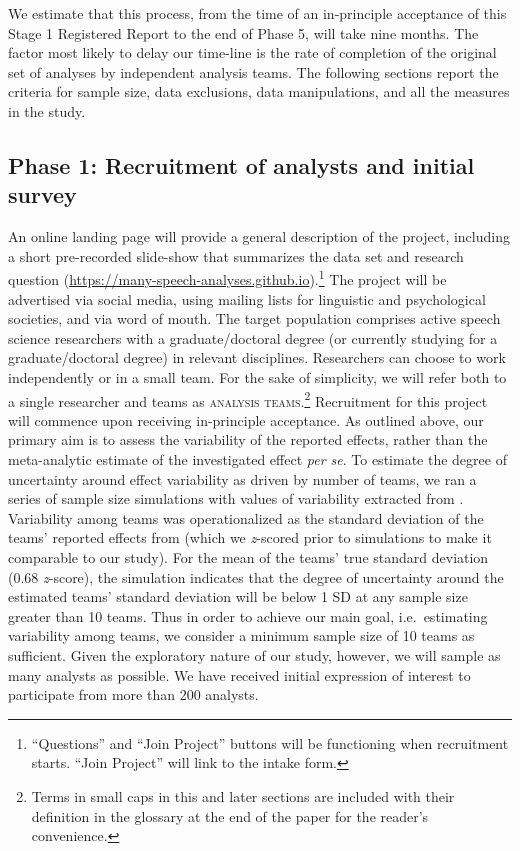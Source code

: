 \documentclass[Review,times,sageh]{sagej}
\begin{document}
We estimate that this process, from the time of an in-principle
acceptance of this Stage 1 Registered Report to the end of Phase 5, will
take nine months. The factor most likely to delay our time-line is the
rate of completion of the original set of analyses by independent
analysis teams. The following sections report the criteria for sample
size, data exclusions, data manipulations, and all the measures in the
study.

\subsection{Phase 1: Recruitment of analysts and initial
survey}\label{phase-1-recruitment-of-analysts-and-initial-survey}

An online landing page will provide a general description of the
project, including a short pre-recorded slide-show that summarizes the
data set and research question
(\url{https://many-speech-analyses.github.io}).\footnote{``Questions''
  and ``Join Project'' buttons will be functioning when recruitment
  starts. ``Join Project'' will link to the intake form.} The project
will be advertised via social media, using mailing lists for linguistic
and psychological societies, and via word of mouth. The target
population comprises active speech science researchers with a
graduate/doctoral degree (or currently studying for a graduate/doctoral
degree) in relevant disciplines. Researchers can choose to work
independently or in a small team. For the sake of simplicity, we will
refer both to a single researcher and teams as
\textsc{analysis teams}.\footnote{Terms in small caps in this and later
  sections are included with their definition in the glossary at the end
  of the paper for the reader's convenience.} Recruitment for this
project will commence upon receiving in-principle acceptance. As
outlined above, our primary aim is to assess the variability of the
reported effects, rather than the meta-analytic estimate of the
investigated effect \emph{per se}. To estimate the degree of uncertainty
around effect variability as driven by number of teams, we ran a series
of sample size simulations with values of variability extracted from
\citet{silberzahn2018many}. Variability among teams was operationalized
as the standard deviation of the teams' reported effects from
\citet{silberzahn2018many} (which we \emph{z}-scored prior to
simulations to make it comparable to our study). For the mean of the
teams' true standard deviation (0.68 \emph{z}-score), the simulation
indicates that the degree of uncertainty around the estimated teams'
standard deviation will be below 1 SD at any sample size greater than 10
teams. Thus in order to achieve our main goal, i.e.~estimating
variability among teams, we consider a minimum sample size of 10 teams
as sufficient. Given the exploratory nature of our study, however, we
will sample as many analysts as possible. We have received initial
expression of interest to participate from more than 200 analysts.
\end{document}
